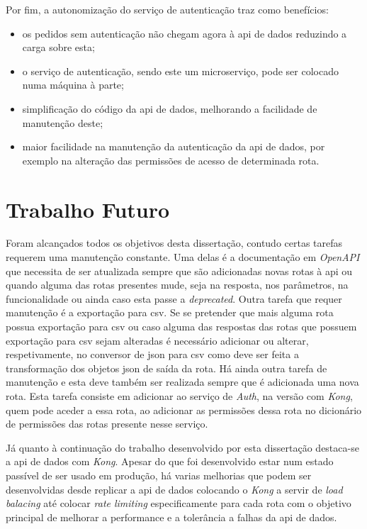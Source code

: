 Por fim, a autonomização do serviço de autenticação traz como benefícios:
\begin{itemize}
    \item os pedidos sem autenticação não chegam agora à \acrshort{api} de dados reduzindo a carga sobre esta;
    \item o serviço de autenticação, sendo este um microserviço, pode ser colocado numa máquina à parte;
    \item simplificação do código da \acrshort{api} de dados, melhorando a facilidade de manutenção deste;
    \item maior facilidade na manutenção da autenticação da \acrshort{api} de dados, por exemplo na alteração das permissões de acesso de determinada rota.
\end{itemize}

\section{Trabalho Futuro}

Foram alcançados todos os objetivos desta dissertação, contudo certas tarefas requerem uma manutenção constante. Uma delas é a documentação em \textit{OpenAPI} que necessita de ser atualizada sempre que são adicionadas novas rotas à \acrshort{api} ou quando alguma das rotas presentes mude, seja na resposta, nos parâmetros, na funcionalidade ou ainda caso esta passe a \textit{deprecated}. Outra tarefa que requer manutenção é a exportação para \acrshort{csv}. Se se pretender que mais alguma rota possua exportação para \acrshort{csv} ou caso alguma das respostas das rotas que possuem exportação para \acrshort{csv} sejam alteradas é necessário adicionar ou alterar, respetivamente, no conversor de \acrshort{json} para \acrshort{csv} como deve ser feita a transformação dos objetos \acrshort{json} de saída da rota. Há ainda outra tarefa de manutenção e esta deve também ser realizada sempre que é adicionada uma nova rota. Esta tarefa consiste em adicionar ao serviço de \textit{Auth}, na versão com \textit{Kong}, quem pode aceder a essa rota, ao adicionar as permissões dessa rota no dicionário de permissões das rotas presente nesse serviço.

Já quanto à continuação do trabalho desenvolvido por esta dissertação destaca-se a \acrshort{api} de dados com \textit{Kong}. Apesar do que foi desenvolvido estar num estado passível de ser usado em produção, há varias melhorias que podem ser desenvolvidas desde replicar a \acrshort{api} de dados colocando o \textit{Kong} a servir de \textit{load balacing} até colocar \textit{rate limiting} especificamente para cada rota com o objetivo principal de melhorar a performance e a tolerância a falhas da \acrshort{api} de dados.

